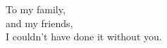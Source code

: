 
\begin{dedication}
\null\vfil
{\large
\begin{center}
To my family,\\\vspace{12pt}
and my friends,\\\vspace{12pt}
I couldn't have done it without you.
\end{center}}
\vfil\null
\end{dedication}
